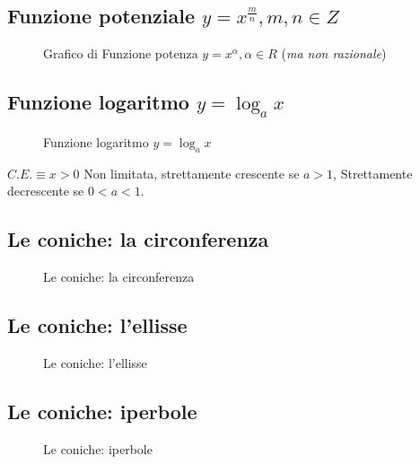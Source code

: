 \subsection{Funzione potenziale $y=x^{\frac{m}{n}},m, n\in Z$}
\begin{figure}[!ht]
	\centering
	\caption{Grafico di Funzione potenza $y=x^\alpha,\alpha \in R$ (\textit{ma non
razionale})}
\end{figure}
\subsection{Funzione logaritmo $y=\log_a{x}$}
\begin{figure}[!ht]
	\centering
	\caption{Funzione logaritmo $y=\log_a{x}$}
\end{figure}
$C.E.\equiv x>0$ Non limitata, strettamente crescente se $a>1$, Strettamente
decrescente se $0<a<1$.\newpage
\subsection{Le coniche: la circonferenza}
\begin{figure}[!ht]
	\centering
	\caption{Le coniche: la circonferenza}
\end{figure}\newpage
\subsection{Le coniche: l'ellisse}
\begin{figure}[!ht]
	\centering
	\caption{Le coniche: l'ellisse}
\end{figure}
\subsection{Le coniche: iperbole}
\begin{figure}[!ht]
	\centering
	\caption{Le coniche: iperbole}
\end{figure}\newpage
